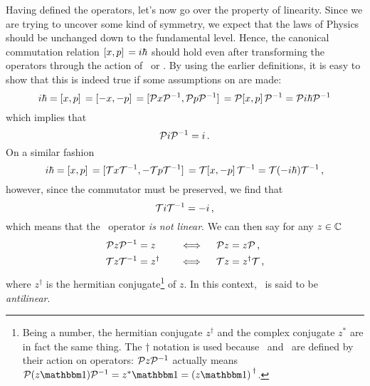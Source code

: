         Having defined the operators, let's now go over the property of linearity. Since we are trying to uncover some kind of symmetry, we expect that the laws of Physics should be unchanged down to the fundamental level. Hence, the canonical commutation relation $\comm*{\hx}{\hp} = i \hbar$ should hold even after transforming the operators through the action of \hP\ or \hT. By using the earlier definitions, it is easy to show that this is indeed true if some assumptions on \hT are made:
        \begin{equation*}
            i \hbar = \comm*{\hx}{\hp} = \comm*{-\hx}{-\hp} = \comm*{\hP \hx \hP^{-1}}{\hP \hp \hP^{-1}} = \hP \comm*{\hx}{\hp} \hP^{-1} = \hP i \hbar \hP^{-1}
        \end{equation*}
        which implies that
        \begin{equation}
            \label{eq:PiP}
            \mathcal{{P}} i \mathcal{{P}}^{-1} = i
            \,\text{.}
        \end{equation}
        On a similar fashion
        \begin{equation*}
            i \hbar
            = \comm*{\hx}{\hp}
            = \comm*{\hT \hx \hT^{-1}}{-\hT \hp \hT^{-1}}
            = \hT \comm*{\hx}{-\hp} \hT^{-1}
            = \hT \pqty{-i \hbar} \hT^{-1}
            \mycomma
        \end{equation*}
        however, since the commutator must be preserved, we find that
        \begin{equation}
            \label{eq:TiT}
            \mathcal{{T}} i \mathcal{{T}}^{-1} = -i
            \,\text{,}
        \end{equation}
        which means that the \hT\ operator \emph{is not linear}. We can then say for any $z \in \mathbb{C}$ 
        \begin{alignat}{3}
            \label{eq:P-linear}
            \mathcal{{P}} z \mathcal{{P}}^{-1} &= z        
            &\quad\iff\quad 
            \mathcal{{P}} z &= z \mathcal{{P}}
            \,\text{,}
            \\
            \label{eq:T-antilinear}
            \mathcal{{T}} z \mathcal{{T}}^{-1} &= z^{\dag} 
            &\quad\iff\quad 
            \mathcal{{T}} z &= z^{\dag} \mathcal{{T}}
            \,\text{,}
        \end{alignat}
        where $z^\dag$ is the hermitian conjugate\footnote{Being a number, the hermitian conjugate $z^\dag$ and the complex conjugate $z^*$ are in fact the same thing. The $\dag$ notation is used because \hP\ and \hT\ are defined by their action on operators: $\mathcal{{P}} z \mathcal{{P}}^{-1}$ actually means $\hP \pqty{z\togglehat{\idM}} \hP^{-1} = z^*\togglehat{\idM} = \pqty*{z \togglehat{\idM}}^\dag$.} of $z$. In this context, \hT\ is said to be \emph{antilinear}.

